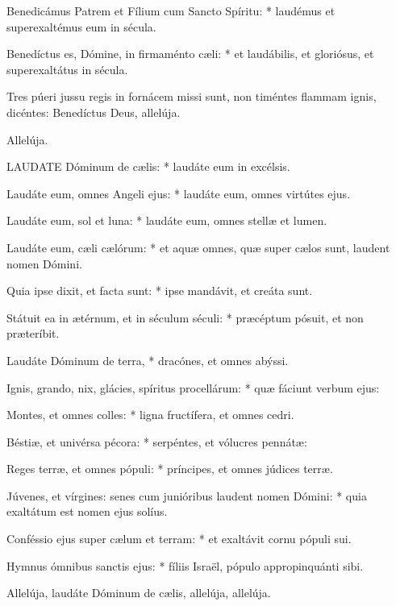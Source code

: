Benedicámus Patrem et Fílium cum Sancto Spíritu: * laudémus et superexaltémus eum in sécula.

Benedíctus es, Dómine, in firmaménto cæli: * et laudábilis, et gloriósus, et superexaltátus in sécula.


 Tres púeri jussu regis in fornácem missi sunt, non timéntes flammam ignis, dicéntes: Benedíctus Deus, allelúja.

 Allelúja.


\lettrine[lines=2]{L}{AUDATE} Dóminum de cælis: * laudáte eum in excélsis.

Laudáte eum, omnes Angeli ejus: * laudáte eum, omnes virtútes ejus.

Laudáte eum, sol et luna: * laudáte eum, omnes stellæ et lumen.

Laudáte eum, cæli cælórum: * et aquæ omnes, quæ super cælos sunt, laudent nomen Dómini.

Quia ipse dixit, et facta sunt: * ipse mandávit, et creáta sunt.

Státuit ea in ætérnum, et in séculum séculi: * præcéptum pósuit, et non præteríbit.

Laudáte Dóminum de terra, * dracónes, et omnes abýssi.

Ignis, grando, nix, glácies, spíritus procellárum: * quæ fáciunt verbum ejus:

Montes, et omnes colles: * ligna fructífera, et omnes cedri.

Béstiæ, et univérsa pécora: * serpéntes, et vólucres pennátæ:

Reges terræ, et omnes pópuli: * príncipes, et omnes júdices terræ.

Júvenes, et vírgines: senes cum junióribus laudent nomen Dómini: * quia exaltátum est nomen ejus solíus.

Conféssio ejus super cælum et terram: * et exaltávit cornu pópuli sui.

Hymnus ómnibus sanctis ejus: * fíliis Israël, pópulo appropinquánti sibi.

 Allelúja, laudáte Dóminum de cælis, allelúja, allelúja.




